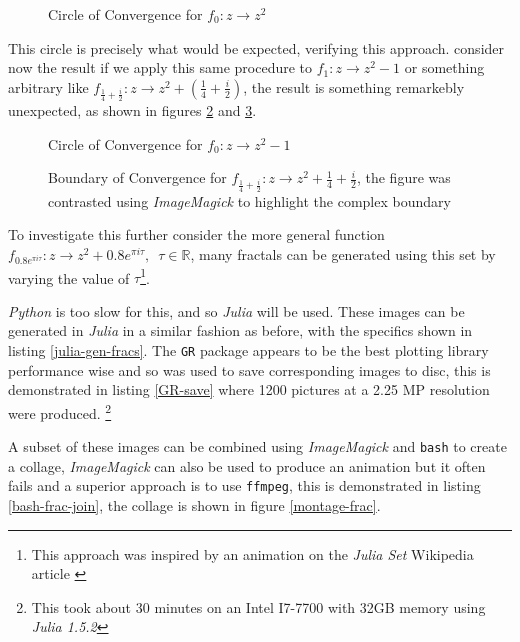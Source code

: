 \documentclass[a4paper,11pt,twoside]{article}
\begin{document}
\begin{figure}[htbp]
\centering

\caption{\label{py-circle-plot}Circle of Convergence for \(f_{0}: z \rightarrow z^{2}\)}
\end{figure}

This circle is precisely what would be expected, verifying this approach.
consider now the result if we apply this same procedure to \(f_{1}: z \rightarrow
z^{2} - 1\) or something arbitrary like \(f_{\frac{1}{4} + \frac{i}{2}}: z
\rightarrow z^{2} + (\frac{1}{4} + \frac{i}{2})\), the result is something
remarkebly unexpected, as shown in figures \ref{py-jl-1-plot} and \ref{py-jl-rab-plot}.


\begin{figure}[htbp]
\centering

\caption{\label{py-jl-1-plot}Circle of Convergence for \(f_{0}: z \rightarrow z^{2} - 1\)}
\end{figure}


\begin{figure}[htbp]
\centering

\caption{\label{py-jl-rab-plot}Boundary of Convergence for \(f_{\frac{1}{4} + \frac{i}{2}}: z \rightarrow z^{2} + \frac{1}{4} + \frac{i}{2}\), the figure was contrasted using \emph{ImageMagick} to highlight the complex boundary}
\end{figure}

To investigate this further consider the
more general function \(f_{0.8 e^{\pi i \tau}}: z \rightarrow z^{2} + 0.8 e^{\pi
i \tau}, \enspace \tau \in \mathbb{R}\), many fractals can be generated using
this set by varying the value of \(\tau\)\footnote{This approach was inspired by an animation on the \emph{Julia Set} Wikipedia article \cite{JuliaSet2020}}.

\emph{Python} is too slow for this, and so \emph{Julia} will be used. These images can be
generated in \emph{Julia} in a similar fashion as before, with the specifics shown in
listing \ref{julia-gen-fracs}. The \texttt{GR} package appears to be the best plotting
library performance wise and so was used to save corresponding images to disc,
this is demonstrated in listing \ref{GR-save} where 1200 pictures at a 2.25 MP
resolution were produced. \footnote{This took about 30 minutes on an Intel I7-7700 with 32GB memory using \emph{Julia 1.5.2}}

A subset of these images can be combined using \emph{ImageMagick} and \texttt{bash} to
create a collage, \emph{ImageMagick} can also be used to produce an animation but it often
fails and a superior approach is to use \texttt{ffmpeg}, this is demonstrated in
listing \ref{bash-frac-join}, the collage is shown in figure \ref{montage-frac}.
\end{document}
